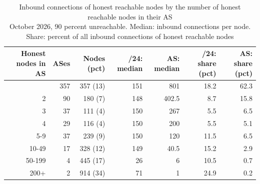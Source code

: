 \begin{table}[t]
\caption{
{\fontsize{20}{25}\selectfont  Inbound connections of honest reachable nodes by the number of honest reachable nodes in their AS} \\ 
{\fontsize{14}{17}\selectfont  October 2026, 90 percent unreachable. Median: inbound connections per node. Share: percent of all inbound connections of honest reachable nodes}
} 
\begin{tabular*}{\linewidth}{@{\extracolsep{\fill}}rrrrrrr}
\toprule
Honest nodes in AS & ASes & Nodes (pct) & /24: median & AS: median & /24: share (pct) & AS: share (pct) \\ 
\midrule\addlinespace[2.5pt]
1 & 357 & 357 (13) & 151 & 801 & 18.2 & 62.3 \\ 
2 & 90 & 180 (7) & 148 & 402.5 & 8.7 & 15.8 \\ 
3 & 37 & 111 (4) & 150 & 267 & 5.5 & 6.5 \\ 
4 & 29 & 116 (4) & 150 & 200 & 5.5 & 5.1 \\ 
5-9 & 37 & 239 (9) & 150 & 120 & 11.5 & 6.5 \\ 
10-49 & 17 & 328 (12) & 149 & 40.5 & 15.2 & 2.9 \\ 
50-199 & 4 & 445 (17) & 26 & 6 & 10.5 & 0.7 \\ 
200+ & 2 & 914 (34) & 71 & 1 & 24.9 & 0.2 \\ 
\bottomrule
\end{tabular*}
\label{table-inbound-by-asn-size}
\end{table}
